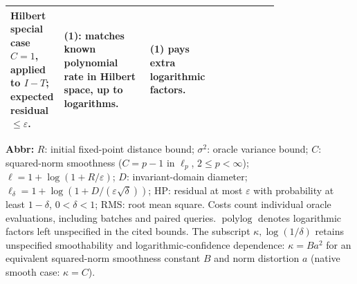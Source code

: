 \begin{table}[tp]
\begin{threeparttable}
\begin{tabularx}{\linewidth}{@{}>{\raggedright\arraybackslash}p{0.20\linewidth}>{\raggedright\arraybackslash}p{0.32\linewidth}>{\raggedright\arraybackslash}p{0.25\linewidth}>{\raggedright\arraybackslash}X@{}}
Hilbert special case $C=1$, applied to $I-T$; expected residual $\leq\varepsilon$.
& \textbf{(1)}: matches known polynomial rate in Hilbert space, up to logarithms.
& \textbf{(1)} pays extra logarithmic factors. \\
\bottomrule
\end{tabularx}
\begin{tablenotes}[flushleft]\footnotesize
\item[] \textbf{Abbr:} $R$: initial fixed-point distance bound; $\sigma^2$: oracle variance bound; $C$: squared-norm smoothness ($C=p-1$ in $\ell_p$, $2\leq p<\infty$); $\ell=1+\log(1+R/\varepsilon)$; $D$: invariant-domain diameter; $\ell_\delta=1+\log(1+D/(\varepsilon\sqrt\delta))$; HP: residual at most $\varepsilon$ with probability at least $1-\delta$, $0<\delta<1$; RMS: root mean square. Costs count individual oracle evaluations, including batches and paired queries. $\operatorname{polylog}$ denotes logarithmic factors left unspecified in the cited bounds. The subscript $\kappa,\log(1/\delta)$ retains unspecified smoothability and logarithmic-confidence dependence: $\kappa=Ba^2$ for an equivalent squared-norm smoothness constant $B$ and norm distortion $a$ (native smooth case: $\kappa=C$).
\end{tablenotes}
\end{threeparttable}
\end{table}
